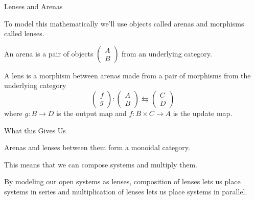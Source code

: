 \documentclass{beamer}
\begin{document}
\begin{frame}{Lenses and Arenas}
    \begin{large}
        To model this mathematically we'll use objects called arenas and morphisms called lenses.

    \end{large}

    \vspace*{0.125in}
    \begin{definition}[Arenas]
        An arena is a pair of objects $\begin{pmatrix}A \\ B\end{pmatrix}$ from an underlying category.
    \end{definition}

    \begin{definition}[Lenses]
        \vspace*{0.125in}

        A lens is a morphism between arenas made from a pair of morphisms from the underlying category
        $$\begin{pmatrix}f \\ g\end{pmatrix}: \begin{pmatrix}A \\ B\end{pmatrix} \leftrightarrows \begin{pmatrix}C \\ D\end{pmatrix}$$
        where $g:B\rightarrow D$ is the output map and $f:B\times C \rightarrow A$ is the update map.
    \end{definition}
\end{frame}


\begin{frame}{What this Gives Us}
    \begin{large}
        Arenas and lenses between them form a monoidal category.

        \vspace*{0.125in}
        This means that we can compose systems and multiply them.

        \vspace*{0.125in}
        By modeling our open systems as lenses, composition of lenses lets us place systems in series and multiplication of lenses lets us place systems in parallel.

    \end{large}

\end{frame}
\end{document}
